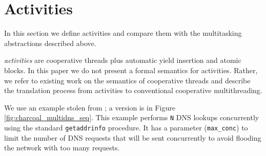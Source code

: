 \documentclass[a4paper,UKenglish,cleveref, autoref]{lipics-v2019}
\begin{document}



\section{Activities}

In this section we define activities and compare them with the multitasking abstractions described above.

\emph{activities} are cooperative threads plus automatic yield insertion and atomic blocks.
In this paper we do not present a formal semantics for activities.
Rather, we refer to existing work on the semantics of cooperative threads \cite{Abadi2009} and describe the translation process from activities to conventional cooperative multithreading.

We use an example stolen from \cite{Krohn2007}; a \charcoal{} version is in Figure \ref{fig:charcoal_multidns_seq}.
This example performs \texttt{N} DNS lookups concurrently using the standard \texttt{getaddrinfo} procedure.
It has a parameter (\texttt{max\_conc}) to limit the number of DNS requests that will be sent concurrently to avoid flooding the network with too many requests.
\end{document}
